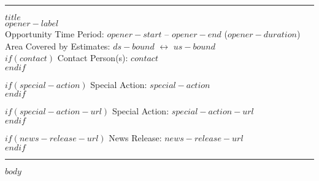 \documentclass[letterpaper,11pt,$for(classoption)$$classoption$$sep$,$endfor$]{article}
\begin{document}
\rule{\textwidth}{1pt}
\begin{flushleft}

{\bf\LARGE{$title$}}\\
{\Large{$opener-label$}}\\

{\small{Opportunity Time Period: $opener-start$ -- $opener-end$ ($opener-duration$)}}\\

{\small{Area Covered by Estimates: $ds-bound$ \( \longleftrightarrow \) $us-bound$}}\\

$if(contact)$
{\small{Contact Person(s): $contact$}}\\
$endif$

$if(special-action)$
{\small{Special Action: $special-action$}}\\
$endif$

$if(special-action-url)$
{\small{Special Action: $special-action-url$}}\\
$endif$

$if(news-release-url)$
{\small{News Release: $news-release-url$}}\\
$endif$
\end{flushleft}
\vspace{-10pt}
\rule{\textwidth}{1pt}

$body$

\end{document}
